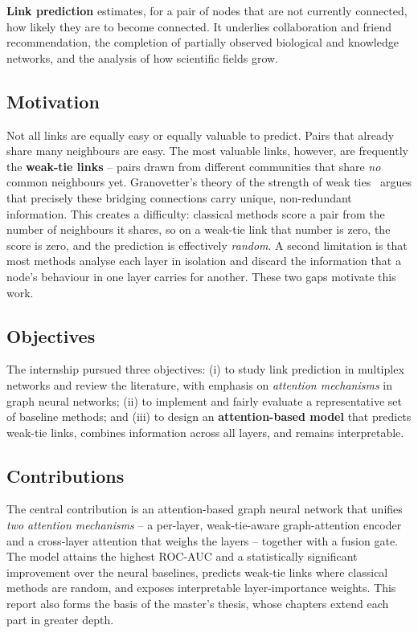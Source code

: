 \documentclass[11pt,a4paper]{article}
\begin{document}
\textbf{Link prediction} estimates, for a pair of nodes that are not currently connected, how likely
they are to become connected. It underlies collaboration and friend recommendation, the completion
of partially observed biological and knowledge networks, and the analysis of how scientific fields
grow.

\subsection{Motivation}
Not all links are equally easy or equally valuable to predict. Pairs that already share many
neighbours are easy. The most valuable links, however, are frequently the \textbf{weak-tie links} --
pairs drawn from different communities that share \emph{no} common neighbours yet. Granovetter's
theory of the strength of weak ties~\cite{granovetter1973} argues that precisely these bridging
connections carry unique, non-redundant information. This creates a difficulty: classical methods
score a pair from the number of neighbours it shares, so on a weak-tie link that number is zero, the
score is zero, and the prediction is effectively \emph{random}. A second limitation is that most
methods analyse each layer in isolation and discard the information that a node's behaviour in one
layer carries for another. These two gaps motivate this work.

\subsection{Objectives}
The internship pursued three objectives: (i) to study link prediction in multiplex networks and
review the literature, with emphasis on \emph{attention mechanisms} in graph neural networks; (ii)
to implement and fairly evaluate a representative set of baseline methods; and (iii) to design an
\textbf{attention-based model} that predicts weak-tie links, combines information across all layers,
and remains interpretable.

\subsection{Contributions}
The central contribution is an attention-based graph neural network that unifies \emph{two attention
mechanisms} -- a per-layer, weak-tie-aware graph-attention encoder and a cross-layer attention that
weighs the layers -- together with a fusion gate. The model attains the highest ROC-AUC and a
statistically significant improvement over the neural baselines, predicts weak-tie links where
classical methods are random, and exposes interpretable layer-importance weights. This report also
forms the basis of the master's thesis, whose chapters extend each part in greater depth.
\end{document}
